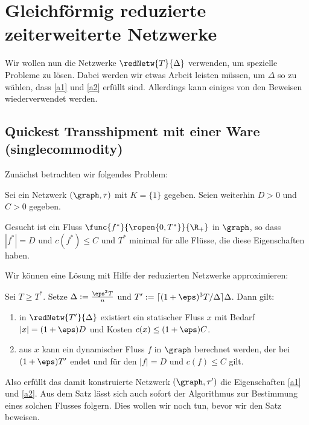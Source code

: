 \section{Gleichförmig reduzierte zeiterweiterte Netzwerke}\label{sec:unif_cond}
Wir wollen nun die Netzwerke $\redNetw{T}{\Delta}$ verwenden, um spezielle
Probleme zu lösen. Dabei werden wir etwas Arbeit leisten müssen, um
$\Delta$ so zu wählen, dass \ref{a1} und \ref{a2} erfüllt sind.
Allerdings kann einiges von den Beweisen wiederverwendet werden.

\subsection{Quickest Transshipment mit einer Ware (singlecommodity)}
Zunächst betrachten wir folgendes Problem:

\begin{problem}
\label{prob:qtp_single}
    Sei ein Netzwerk $(\graph, \tau)$ mit $K=\{1\}$ gegeben.
    Seien weiterhin $D > 0$ und $C > 0$ gegeben.
    
    Gesucht ist ein Fluss $\func{f^*}{\ropen{0,T^*}}{\R_+}$ in $\graph$,
    so dass $|f^*| = D$ und $c(f^*) \leq C$ und $T^*$ minimal für alle Flüsse,
    die diese Eigenschaften haben.
\end{problem}

Wir können eine Lösung mit Hilfe der reduzierten Netzwerke approximieren:

\begin{theorem}\label{theo:qtp_flow_ex}
    Sei $T \geq T^*$. Setze $\Delta := \frac{\eps^2 T}{n}$ und
    $T' := \lceil (1+\eps)^3 T / \Delta \rceil \Delta$.
    Dann gilt:
    \begin{enumerate}[label={\alph*)}]
        \item in $\redNetw{T'}{\Delta}$ existiert ein statischer Fluss $x$ mit
            Bedarf $|x| = (1 + \eps)D$ und Kosten $c(x) \leq (1+\eps)C$.
        \item aus $x$ kann ein dynamischer Fluss $f$ in $\graph$ berechnet werden,
            der bei $(1+\eps)T'$ endet und für den $|f| = D$ und $c(f) \leq C$
            gilt.
    \end{enumerate}
\end{theorem}

Also erfüllt das damit konstruierte Netzwerk $(\graph, \tau')$ die Eigenschaften
\ref{a1} und \ref{a2}. Aus dem Satz lässt sich auch sofort der Algorithmus
zur Bestimmung eines solchen Flusses folgern. Dies wollen wir noch tun,
bevor wir den Satz beweisen.

